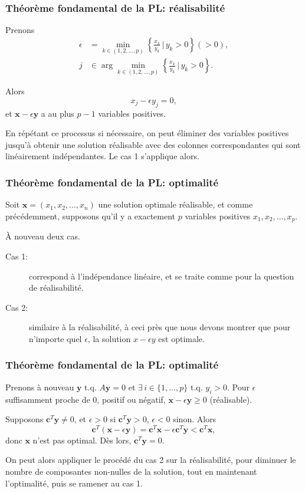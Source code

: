 \documentclass[usepdftitle=false]{beamer}
\def\bc{\boldsymbol{c}}
\def\bx{\boldsymbol{x}}
\def\by{\boldsymbol{y}}
\begin{document}
\begin{frame}
\frametitle{Théorème fondamental de la PL: réalisabilité}

Prenons
\begin{align*}
\epsilon &= \min_{k \in (1,2,\ldots,p)} \left\lbrace \frac{x_k}{y_k} \,\bigg|\, y_k > 0 \right\rbrace (> 0), \\
j &\in \arg \min_{k \in (1,2,\ldots,p)} \left\lbrace \frac{x_k}{y_k} \,\bigg|\, y_k > 0 \right\rbrace.
\end{align*}

Alors
$$
x_j - \epsilon y_j = 0,
$$
et $\bx - \epsilon\by$ a au plus $p-1$ variables positives.

\mbox{}

En répétant ce processus si nécessaire, on peut éliminer des variables positives jusqu'à obtenir une solution réalisable avec des colonnes correspondantes qui sont linéairement indépendantes. Le cas 1 s'applique alors.

\end{frame}

\begin{frame}
\frametitle{Théorème fondamental de la PL: optimalité}

Soit $\bx = (x_1, x_2, \ldots, x_n)$ une solution optimale réalisable, et comme précédemment, supposons qu'il y a exactement $p$ variables positives $x_1, x_2, \ldots, x_p$.

\mbox{}

À nouveau deux cas.
\begin{description}
\item[Cas 1:] correspond à l'indépendance linéaire, et se traite comme pour la question de réalisabilité.
\item[Cas 2:]
similaire à la réalisabilité, à ceci près que nous devons montrer que pour n'importe quel $\epsilon$, la solution $x-\epsilon y$ est optimale.
\end{description}

\end{frame}

\begin{frame}
\frametitle{Théorème fondamental de la PL: optimalité}

Prenons à nouveau $\by$ t.q. $A\by = 0$ et $\exists\, i \in \{1,\ldots,p\}$ t.q. $y_i > 0$.
Pour $\epsilon$ suffisamment proche de 0, positif ou négatif, $\bx - \epsilon \by \geq 0$ (réalisable).

\mbox{}

Supposons $\bc^T\by \ne 0$, et $\epsilon > 0$ si $\bc^T\by > 0$, $\epsilon < 0$ sinon. Alors
$$
\bc^T(\bx - \epsilon \by) = \bc^T \bx - \epsilon \bc^T\by < \bc^T \bx,
$$
donc $\bx$ n'est pas optimal.
Dès lors, $\bc^T\by = 0$.

\mbox{}

On peut alors appliquer le procédé du cas 2 sur la réalisabilité, pour diminuer le nombre de composantes non-nulles de la solution, tout en maintenant l'optimalité, puis se ramener au cas 1.

\end{frame}
\end{document}
